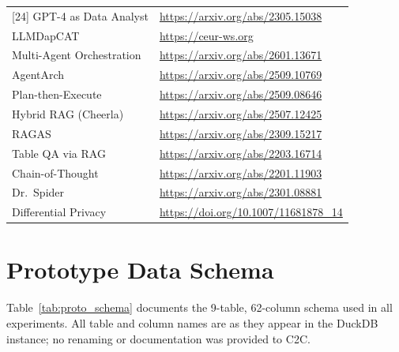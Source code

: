 \documentclass[11pt,a4paper]{article}
\begin{document}
\begin{table}[H]
\begin{tabular}{lp{9.2cm}}
[24] GPT-4 as Data Analyst & \url{https://arxiv.org/abs/2305.15038} \\
[25] LLMDapCAT & \url{https://ceur-ws.org} \\
[26] Multi-Agent Orchestration & \url{https://arxiv.org/abs/2601.13671} \\
[27] AgentArch & \url{https://arxiv.org/abs/2509.10769} \\
[28] Plan-then-Execute & \url{https://arxiv.org/abs/2509.08646} \\
[29] Hybrid RAG (Cheerla) & \url{https://arxiv.org/abs/2507.12425} \\
[30] RAGAS & \url{https://arxiv.org/abs/2309.15217} \\
[31] Table QA via RAG & \url{https://arxiv.org/abs/2203.16714} \\
[32] Chain-of-Thought & \url{https://arxiv.org/abs/2201.11903} \\
[33] Dr.\ Spider & \url{https://arxiv.org/abs/2301.08881} \\
[34] Differential Privacy & \url{https://doi.org/10.1007/11681878\_14} \\
\bottomrule
\end{tabular}
\end{table}

\section{Prototype Data Schema}\label{app:schema_tables}

Table~\ref{tab:proto_schema} documents the 9-table, 62-column schema used in all
experiments.  All table and column names are as they appear in the DuckDB instance;
no renaming or documentation was provided to C2C.
\end{document}
